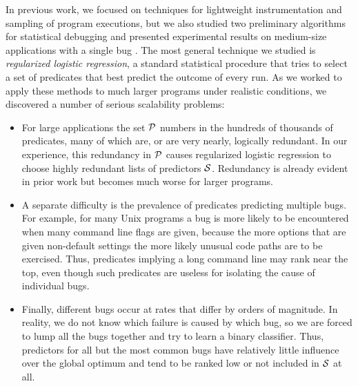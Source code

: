\documentclass[draft]{sig-alternate}
\newcommand{\termdef}[1]{\emph{#1}}
\begin{document}
In previous work, we focused on techniques
for lightweight instrumentation and sampling of program executions, but
we also studied two preliminary algorithms for statistical debugging and
presented experimental results on medium-size applications with a
single bug \cite{PLDI`03*141,NIPS2003_AP05}.  The most general
technique we studied is \termdef{regularized logistic regression}, a standard
statistical procedure that tries to select a set of predicates that
best predict the outcome of every run. As we worked to apply these
methods to much larger programs under realistic conditions, we
discovered a number of serious scalability problems:
\begin{itemize}

\item For large applications the set ${\cal P}$ numbers in the hundreds of
thousands of predicates, many of which are, or are very nearly,
logically redundant.  In our experience, this redundancy in ${\cal P}$
causes regularized logistic regression to choose highly redundant lists of
predictors ${\cal S}$.  Redundancy is
already evident in prior work \cite{PLDI`03*141} but becomes much
worse for larger programs.

\item A separate difficulty is the prevalence of predicates predicting
multiple bugs.  For example, for many Unix programs a bug is more
likely to be encountered when many command line flags are given,
because the more options that are given non-default settings the more
likely unusual code paths are to be exercised.  Thus, predicates
implying a long command line may rank near the top, even though such
predicates are useless for isolating the cause of individual bugs.

\item Finally, different bugs occur at rates that differ by orders of
magnitude.  In reality, we do not know which failure is caused by which bug,
so we are forced to lump all the bugs together and try to learn a binary
classifier.  Thus, predictors for all but the most common bugs have relatively little
influence over the global optimum and tend to be ranked low or not included
in ${\cal S}$ at all.

\end{itemize}
\end{document}
